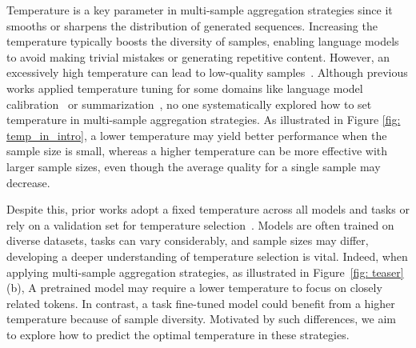 Temperature is a key parameter in multi-sample aggregation strategies since it smooths or sharpens the distribution of generated sequences. Increasing the temperature typically boosts the diversity of samples, enabling language models to avoid making trivial mistakes or generating repetitive content. However, an excessively high temperature can lead to low-quality samples~\cite{renze2024effect}. Although previous works applied temperature tuning for some domains like language model calibration~\cite{xie2024calibrating} or summarization~\cite{meister2023locally}, no one systematically explored how to set temperature in multi-sample aggregation strategies. As illustrated in Figure \ref{fig: temp_in_intro}, a lower temperature may yield better performance when the sample size is small, whereas a higher temperature can be more effective with larger sample sizes, even though the average quality for a single sample may decrease.

Despite this, prior works adopt a fixed temperature across all models and tasks or rely on a validation set for temperature selection~\cite{zhang2024scaling}. Models are often trained on diverse datasets, tasks can vary considerably, and sample sizes may differ, developing a deeper understanding of temperature selection is vital. Indeed, when applying multi-sample aggregation strategies, as illustrated in Figure~\ref{fig: teaser}(b), A pretrained model may require a lower temperature to focus on closely related tokens. In contrast, a task fine-tuned model could benefit from a higher temperature because of sample diversity. Motivated by such differences, we aim to explore how to predict the optimal temperature in these strategies.


